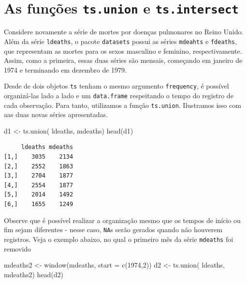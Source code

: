 \documentclass[
  letterpaper,
  DIV=11,
  numbers=noendperiod]{scrartcl}
\newenvironment{Shaded}{\begin{snugshade}}{\end{snugshade}}
\newcommand{\AttributeTok}[1]{\textcolor[rgb]{0.40,0.45,0.13}{#1}}
\newcommand{\DecValTok}[1]{\textcolor[rgb]{0.68,0.00,0.00}{#1}}
\newcommand{\FunctionTok}[1]{\textcolor[rgb]{0.28,0.35,0.67}{#1}}
\newcommand{\NormalTok}[1]{\textcolor[rgb]{0.00,0.23,0.31}{#1}}
\newcommand{\OtherTok}[1]{\textcolor[rgb]{0.00,0.23,0.31}{#1}}
\theoremstyle{plain}
\theoremstyle{plain}
\theoremstyle{definition}
\theoremstyle{definition}
\theoremstyle{remark}
\begin{document}
\hypertarget{as-funuxe7uxf5es-ts.union-e-ts.intersect}{%
\section{\texorpdfstring{As funções \texttt{ts.union} e
\texttt{ts.intersect}}{As funções ts.union e ts.intersect}}\label{as-funuxe7uxf5es-ts.union-e-ts.intersect}}

Considere novamente a série de mortes por doenças pulmonares no Reino
Unido. Além da série \texttt{ldeaths}, o pacote \texttt{datasets} possui
as séries \texttt{mdeahts} e \texttt{fdeaths}, que representam as mortes
para os sexos masculino e feminino, respectivamente. Assim, como a
primeira, essas duas séries são mensais, começando em janeiro de 1974 e
terminando em dezembro de 1979.

Desde de dois objetos \texttt{ts} tenham o mesmo argumento
\texttt{frequency}, é possível organizá-las lado a lado e um
\texttt{data.frame} respeitando o tempo do registro de cada observação.
Para tanto, utilizamos a função \texttt{ts.union}. Ilustramos isso com
aas duas novas séries apresentadas.

\begin{Shaded}
\begin{Highlighting}[]
\NormalTok{d1 }\OtherTok{\textless{}{-}} \FunctionTok{ts.union}\NormalTok{( ldeaths, mdeaths)}
\FunctionTok{head}\NormalTok{(d1)}
\end{Highlighting}
\end{Shaded}

\begin{verbatim}
     ldeaths mdeaths
[1,]    3035    2134
[2,]    2552    1863
[3,]    2704    1877
[4,]    2554    1877
[5,]    2014    1492
[6,]    1655    1249
\end{verbatim}

Observe que é possível realizar a organização mesmo que os tempos de
início ou fim sejam diferentes - nesse caso, \texttt{NA}s serão gerados
quando não houverem registros. Veja o exemplo abaixo, no qual o primeiro
mês da série \texttt{mdeaths} foi removido

\begin{Shaded}
\begin{Highlighting}[]
\NormalTok{mdeaths2 }\OtherTok{\textless{}{-}} \FunctionTok{window}\NormalTok{(mdeaths, }\AttributeTok{start =} \FunctionTok{c}\NormalTok{(}\DecValTok{1974}\NormalTok{,}\DecValTok{2}\NormalTok{))}
\NormalTok{d2 }\OtherTok{\textless{}{-}} \FunctionTok{ts.union}\NormalTok{( ldeaths, mdeaths2)}
\FunctionTok{head}\NormalTok{(d2)}
\end{Highlighting}
\end{Shaded}
\end{document}
